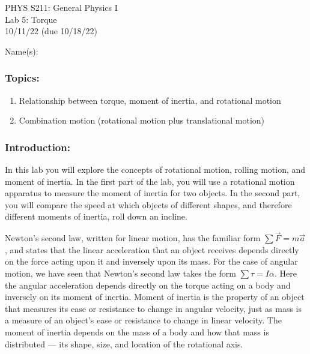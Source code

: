 \documentclass[11pt,letterpaper]{article}
\begin{document}
\setlength{\parindent}{0in}


\begin{flushright}
PHYS S211: General Physics I\\
Lab 5: Torque\\
10/11/22 (due 10/18/22)
\end{flushright}

Name(s):\\

\subsubsection*{Topics:}
\begin{enumerate}
\setlength{\parskip}{3pt}
\item Relationship between torque, moment of inertia, and rotational motion
\item Combination motion (rotational motion plus translational motion)
\end{enumerate}

\subsubsection*{Introduction:}
In this lab you will explore the concepts of rotational motion, rolling motion, and moment of inertia. In the first part of the lab, you will use a rotational motion apparatus to measure the moment of inertia for two objects. In the second part, you will compare the speed at which objects of different shapes, and therefore different moments of inertia, roll down an incline.  
 
Newton's second law, written for linear motion, has the familiar form $\sum \vec F=m\vec a$, and states that the linear acceleration that an object receives depends directly on the force acting upon it
and inversely upon its mass.  For the case of angular motion, we have seen that Newton's
second law takes the form $\sum\tau = I \alpha$. Here the angular acceleration depends directly on the torque acting on a body and inversely on its moment of inertia.  Moment of inertia is the
property of an object that measures its ease or resistance to change in angular velocity, just as mass is a measure of an object's ease or resistance to change in linear velocity. The moment of inertia depends on the mass of a body and how that mass is distributed --- its shape, size, and location of the rotational axis.
\end{document}
